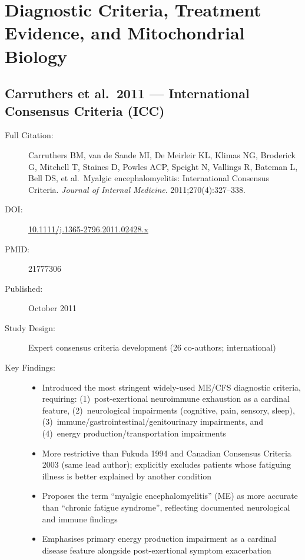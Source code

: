 \section{Diagnostic Criteria, Treatment Evidence, and Mitochondrial Biology}
\label{sec:bib-criteria-treatment-mito}

\subsection{Carruthers et al.\ 2011 --- International Consensus Criteria (ICC)}

\begin{description}
    \item[Full Citation:] Carruthers BM, van de Sande MI, De Meirleir KL, Klimas NG, Broderick G, Mitchell T, Staines D, Powles ACP, Speight N, Vallings R, Bateman L, Bell DS, et al.\ Myalgic encephalomyelitis: International Consensus Criteria. \textit{Journal of Internal Medicine}. 2011;270(4):327--338.
    \item[DOI:] \href{https://doi.org/10.1111/j.1365-2796.2011.02428.x}{10.1111/j.1365-2796.2011.02428.x}
    \item[PMID:] 21777306
    \item[Published:] October 2011
    \item[Study Design:] Expert consensus criteria development (26 co-authors; international)
    \item[Key Findings:]
    \begin{itemize}
        \item Introduced the most stringent widely-used ME/CFS diagnostic criteria, requiring: (1)~post-exertional neuroimmune exhaustion as a cardinal feature, (2)~neurological impairments (cognitive, pain, sensory, sleep), (3)~immune/gastrointestinal/genitourinary impairments, and (4)~energy production/transportation impairments
        \item More restrictive than Fukuda 1994 and Canadian Consensus Criteria 2003 (same lead author); explicitly excludes patients whose fatiguing illness is better explained by another condition
        \item Proposes the term ``myalgic encephalomyelitis'' (ME) as more accurate than ``chronic fatigue syndrome'', reflecting documented neurological and immune findings
        \item Emphasises primary energy production impairment as a cardinal disease feature alongside post-exertional symptom exacerbation

\end{itemize}
\end{description}
